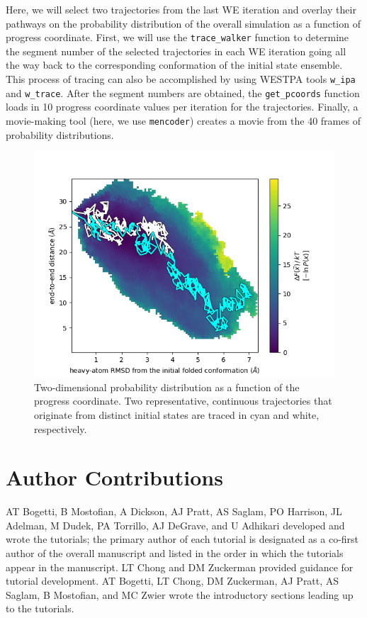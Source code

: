 \documentclass[9pt,tutorial,pubversion]{livecoms}
\begin{document}
Here, we will select two trajectories from the last WE iteration and overlay their pathways on the probability distribution of the overall simulation as a function of progress coordinate. 
First, we will use the \verb|trace_walker| function to determine the segment number of the selected trajectories in each WE iteration going all the way back to the corresponding conformation of the initial state ensemble. 
This process of tracing can also be accomplished by using WESTPA tools \verb|w_ipa| and \verb|w_trace|. 
After the segment numbers are obtained, the \verb|get_pcoords| function loads in 10 progress coordinate values per iteration for the trajectories. 
Finally, a movie-making tool (here, we use \verb|mencoder|) creates a movie from the 40 frames of probability distributions. 

\begin{figure}
\includegraphics[width=\linewidth]{Figure13.png}
\caption{Two-dimensional probability distribution as a function of the progress coordinate. 
Two representative, continuous trajectories that originate from distinct initial states are traced in cyan and white, respectively.}
\label{fig:view}
\end{figure}

\section{Author Contributions}

AT Bogetti, B Mostofian, A Dickson, AJ Pratt, AS Saglam, PO Harrison, JL Adelman, M Dudek, PA Torrillo, AJ DeGrave, and U Adhikari developed and wrote the tutorials; the primary author of each tutorial is designated as a co-first author of the overall manuscript and listed in the order in which the tutorials appear in the manuscript. LT Chong and DM Zuckerman provided guidance for tutorial development. 
AT Bogetti, LT Chong, DM Zuckerman, AJ Pratt, AS Saglam, B Mostofian, and MC Zwier wrote the introductory sections leading up to the tutorials. 
\end{document}
